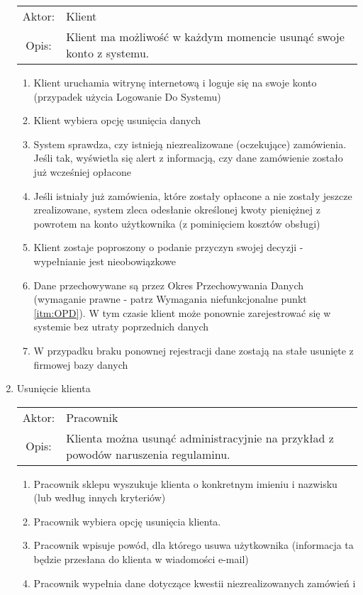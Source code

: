 \begin{enumerate}
\begin{tabularx}{\linewidth}{ c X }
  Aktor: & Klient \\
  Opis: & Klient ma możliwość w każdym momencie usunąć swoje konto z systemu.\\
  \end{tabularx}
  \begin{enumerate}
    \item Klient uruchamia witrynę internetową i loguje się na swoje konto
    (przypadek użycia Logowanie Do Systemu)
    \item Klient wybiera opcję usunięcia danych
    \item System sprawdza, czy istnieją niezrealizowane (oczekujące) zamówienia.
    Jeśli tak, wyświetla się alert z informacją, czy dane zamówienie zostało już
    wcześniej opłacone
    \item Jeśli istniały już zamówienia, które zostały opłacone a nie zostały
    jeszcze zrealizowane, system zleca odesłanie określonej kwoty pieniężnej z
    powrotem na konto użytkownika (z pominięciem kosztów obsługi)
    \item Klient zostaje poproszony o podanie przyczyn swojej decyzji -
    wypełnianie jest nieobowiązkowe
    \item Dane przechowywane są przez Okres Przechowywania Danych (wymaganie
    prawne - patrz Wymagania niefunkcjonalne punkt \ref{itm:OPD}). W tym
    czasie klient może ponownie zarejestrować się w systemie bez utraty poprzednich danych
    \item W przypadku braku ponownej rejestracji dane zostają na stałe usunięte
    z firmowej bazy danych
  \end{enumerate}
  \item Usunięcie klienta \\
  \begin{tabularx}{\linewidth}{ c X }
  Aktor: & Pracownik \\
  Opis: & Klienta można usunąć administracyjnie na przykład z powodów
  naruszenia regulaminu.\\
  \end{tabularx}
  \begin{enumerate}
    \item Pracownik sklepu wyszukuje klienta o konkretnym imieniu i nazwisku
    (lub według innych kryteriów)
    \item Pracownik wybiera opcję usunięcia klienta. 
    \item Pracownik wpisuje powód, dla którego usuwa użytkownika (informacja ta
    będzie przesłana do klienta w wiadomości e-mail)
    \item Pracownik wypełnia dane dotyczące kwestii niezrealizowanych zamówień i

\end{enumerate}
\end{enumerate}
